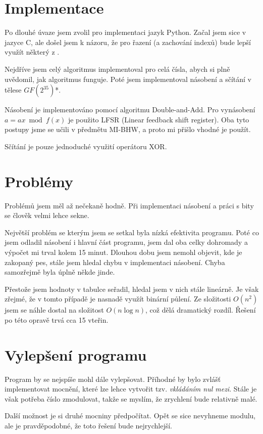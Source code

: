 \documentclass[czech,a4paper,11pt]{article}
\begin{document}
\section{Implementace}

Po dlouhé úvaze jsem zvolil pro implementaci jazyk Python. Začal jsem sice v jazyce C, ale došel jsem k názoru, že pro řazení (a zachování indexů) bude lepší využít některý z .

Nejdříve jsem celý algoritmus implementoval pro celá čísla, abych si plně uvědomil, jak algoritmus funguje. Poté jsem implementoval násobení a sčítání v tělese $GF(2^{35})$\mbox{*}.

Násobení je implementováno pomocí algoritmu Double-and-Add. Pro vynásobení $a=ax \bmod {f(x)}$ je použito LFSR (Linear feedback shift register). Oba tyto postupy jsme se učili v předmětu MI-BHW, a proto mi přišlo vhodné je použít.

Sčítání je pouze jednoduché využití operátoru XOR.

\section{Problémy}
Problémů jsem měl až nečekaně hodně. Při implementaci násobení a práci s bity se člověk velmi lehce sekne.

Největší problém se kterým jsem se setkal byla nízká efektivita programu. Poté co jsem odladil násobení i hlavní část programu, jsem dal oba celky dohromady a výpočet mi trval kolem 15 minut. Dlouhou dobu jsem nemohl objevit, kde je zakopaný pes, stále jsem hledal chybu v implementaci násobení. Chyba samozřejmě byla úplně někde jinde.

Přestože jsem hodnoty v tabulce seřadil, hledal jsem v nich stále lineárně. Je však zřejmé, že v tomto případě je nasnadě využít binární půlení. Ze složitosti $O(n^2)$ jsem se náhle dostal na složitost $O(n\log{}n)$, což dělá dramatický rozdíl. Řešení po této opravě trvá cca 15 vteřin.

\section{Vylepšení programu}

Program by se nejspíše mohl dále vylepšovat. Příhodné by bylo zvlášť implementovat mocnění, které lze lehce vytvořit tzv. \emph{vkládáním nul mezi}. Stále je však potřeba číslo zmodulovat, takže se myslím, že zrychlení bude relativně malé. 

Další možnost je si druhé mocniny předpočítat. Opět se sice nevyhneme modulu, ale je pravděpodobné, že toto řešení bude nejrychlejší.
\end{document}
